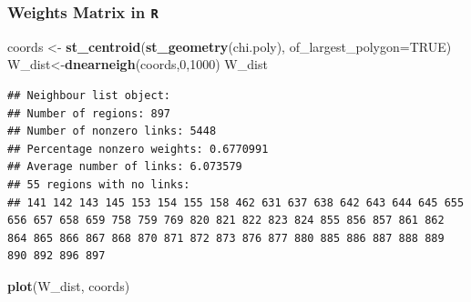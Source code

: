 \documentclass[
  shownotes,
  xcolor={svgnames},
  hyperref={colorlinks,citecolor=DarkBlue,linkcolor=DarkRed,urlcolor=DarkBlue}
   , aspectratio=169]{beamer}
\newenvironment{Shaded}{\begin{snugshade}}{\end{snugshade}}
\newcommand{\DataTypeTok}[1]{\textcolor[rgb]{0.13,0.29,0.53}{#1}}
\newcommand{\DecValTok}[1]{\textcolor[rgb]{0.00,0.00,0.81}{#1}}
\newcommand{\KeywordTok}[1]{\textcolor[rgb]{0.13,0.29,0.53}{\textbf{#1}}}
\newcommand{\NormalTok}[1]{#1}
\newcommand{\OtherTok}[1]{\textcolor[rgb]{0.56,0.35,0.01}{#1}}
\newcommand{\StringTok}[1]{\textcolor[rgb]{0.31,0.60,0.02}{#1}}
\begin{document}
\begin{frame}[fragile]
\frametitle{Weights Matrix in \texttt{R}}


\begin{scriptsize}
\begin{Shaded}
\begin{Highlighting}[]
\NormalTok{coords \textless{}{-}}\StringTok{ }\KeywordTok{st\_centroid}\NormalTok{(}\KeywordTok{st\_geometry}\NormalTok{(chi.poly), }\DataTypeTok{of\_largest\_polygon=}\OtherTok{TRUE}\NormalTok{)}
\NormalTok{W\_dist\textless{}{-}}\KeywordTok{dnearneigh}\NormalTok{(coords,}\DecValTok{0}\NormalTok{,}\DecValTok{1000}\NormalTok{)}
\NormalTok{W\_dist}
\end{Highlighting}
\end{Shaded}
\end{scriptsize}
\begin{tiny}
\begin{verbatim}
## Neighbour list object:
## Number of regions: 897 
## Number of nonzero links: 5448 
## Percentage nonzero weights: 0.6770991 
## Average number of links: 6.073579 
## 55 regions with no links:
## 141 142 143 145 153 154 155 158 462 631 637 638 642 643 644 645 655 656 657 658 659 758 759 769 820 821 822 823 824 855 856 857 861 862 864 865 866 867 868 870 871 872 873 876 877 880 885 886 887 888 889 890 892 896 897
\end{verbatim}

\end{tiny}


\begin{scriptsize}
\begin{Shaded}
\begin{Highlighting}[]
\KeywordTok{plot}\NormalTok{(W\_dist, coords)}
\end{Highlighting}
\end{Shaded}

\end{scriptsize}



\end{frame}
\end{document}

